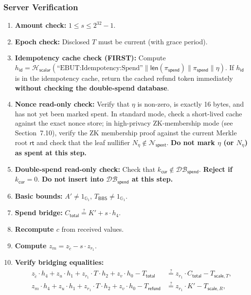 \documentclass[11pt]{article}
\theoremstyle{definitionstyle}
\theoremstyle{plain}
\newcommand{\DB}{\mathcal{DB}}
\begin{document}
\subsubsection{Server Verification}
\begin{enumerate}[leftmargin=*]
\item \textbf{Amount check:} $1 \le s \le 2^{32}-1$.
\item \textbf{Epoch check:} Disclosed $T$ must be current (with grace period).
\item \textbf{Idempotency cache check (FIRST):} Compute $h_{\mathsf{id}} = \mathcal{H}_{\mathsf{scalar}}(\text{``EBUT:Idempotency:Spend''} \parallel \mathsf{len}(\pi_{\mathsf{spend}}) \parallel \pi_{\mathsf{spend}} \parallel \eta)$. If $h_{\mathsf{id}}$ is in the idempotency cache, return the cached refund token immediately \textbf{without checking the double-spend database}.
\item \textbf{Nonce read-only check:} Verify that $\eta$ is non-zero, is exactly 16 bytes, and has not yet been marked spent. In standard mode, check a short-lived cache against the exact nonce store; in high-privacy ZK-membership mode (see Section~7.10), verify the ZK membership proof against the current Merkle root $\mathsf{rt}$ and check that the leaf nullifier $N_\eta \notin \mathcal{N}_{\mathsf{spent}}$. \textbf{Do not mark $\eta$ (or $N_\eta$) as spent at this step.}
\item \textbf{Double-spend read-only check:} Check that $k_{\mathsf{cur}} \notin \DB_{\mathsf{spend}}$. \textbf{Reject if $k_{\mathsf{cur}} = 0$}. \textbf{Do not insert into $\DB_{\mathsf{spend}}$ at this step.}
\item \textbf{Basic bounds:} $A' \neq 1_{\mathbb{G}_1}$, $T_{\mathsf{BBS}} \neq 1_{\mathbb{G}_1}$.
\item \textbf{Spend bridge:} $C_{\mathsf{total}} \stackrel{?}{=} K' + s \cdot h_4$.
\item \textbf{Recompute $c$} from received values.
\item \textbf{Compute $z_m = z_{\tilde{c}} - s \cdot z_{r_1}$}.
\item \textbf{Verify bridging equalities:}
  \begin{align*}
    z_{\tilde{c}} \cdot h_4 + z_u \cdot h_1 + z_{r_1} \cdot T \cdot h_2 + z_v \cdot h_0 - T_{\mathsf{total}} &\stackrel{?}{=} z_{r_1} \cdot C_{\mathsf{total}} - T_{\mathsf{scale},T}, \\
    z_m \cdot h_4 + z_u \cdot h_1 + z_{r_1} \cdot T \cdot h_2 + z_v \cdot h_0 - T_{\mathsf{refund}} &\stackrel{?}{=} z_{r_1} \cdot K' - T_{\mathsf{scale},R}, \\

\end{align*}
\end{enumerate}
\end{document}

